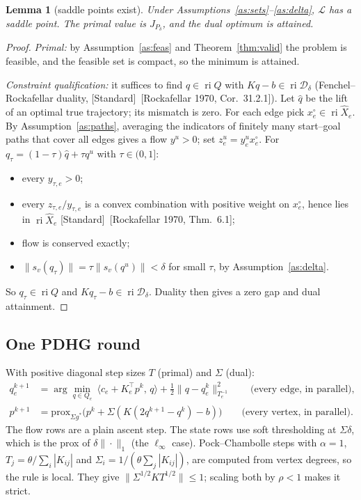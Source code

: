 \documentclass[11pt]{article}
\newcommand{\Jd}{J_{P_\delta}}
\newcommand{\ri}{\operatorname{ri}}
\newcommand{\std}{\textcolor{muted}{[Standard]}\ }
\theoremstyle{plain}
\newtheorem{lemma}[theorem]{Lemma}
\theoremstyle{definition}
\theoremstyle{remark}
\begin{document}
\begin{lemma}[saddle points exist]\label{lem:saddle}
Under Assumptions~\ref{as:sets}--\ref{as:delta}, $\mathcal L$ has a saddle point. The primal value is $\Jd$, and the dual optimum is attained.
\end{lemma}
\begin{proof}
\emph{Primal:} by Assumption~\ref{as:feas} and Theorem~\ref{thm:valid} the problem is feasible, and the feasible set is compact, so the minimum is attained.

\emph{Constraint qualification:} it suffices to find $q\in\ri Q$ with $Kq-b\in\ri\mathcal D_\delta$ (Fenchel--Rockafellar duality, \std[Rockafellar 1970, Cor.~31.2.1]). Let $\hat q$ be the lift of an optimal true trajectory; its mismatch is zero. For each edge pick $x^\circ_e\in\ri\hat X_e$. By Assumption~\ref{as:paths}, averaging the indicators of finitely many start--goal paths that cover all edges gives a flow $y^u>0$; set $z^u_e=y^u_ex^\circ_e$. For $q_\tau=(1-\tau)\hat q+\tau q^u$ with $\tau\in(0,1]$:
\begin{itemize}[leftmargin=1.2em]
  \item every $y_{\tau,e}>0$;
  \item every $z_{\tau,e}/y_{\tau,e}$ is a convex combination with positive weight on $x^\circ_e$, hence lies in $\ri\hat X_e$ \std[Rockafellar 1970, Thm.~6.1];
  \item flow is conserved exactly;
  \item $\|s_v(q_\tau)\|=\tau\|s_v(q^u)\|<\delta$ for small $\tau$, by Assumption~\ref{as:delta}.
\end{itemize}
So $q_\tau\in\ri Q$ and $Kq_\tau-b\in\ri\mathcal D_\delta$. Duality then gives a zero gap and dual attainment.
\end{proof}

\subsection{One PDHG round}
With positive diagonal step sizes $T$ (primal) and $\Sigma$ (dual):
\begin{align*}
q^{k+1}_e&=\arg\min_{q\in Q_e}\ \langle c_e+K_e^\top p^k,\,q\rangle+\tfrac12\|q-q^k_e\|^2_{T_e^{-1}}\qquad\text{(every edge, in parallel)},\\
p^{k+1}&=\mathrm{prox}_{\Sigma g^*}\big(p^k+\Sigma(K(2q^{k+1}-q^k)-b)\big)\qquad\text{(every vertex, in parallel)}.
\end{align*}
The flow rows are a plain ascent step. The state rows use soft thresholding at $\Sigma\delta$, which is the prox of $\delta\|\cdot\|_1$ (the $\ell_\infty$ case). Pock--Chambolle steps with $\alpha=1$, $T_j=\theta/\sum_i|K_{ij}|$ and $\Sigma_i=1/(\theta\sum_j|K_{ij}|)$, are computed from vertex degrees, so the rule is local. They give $\|\Sigma^{1/2}KT^{1/2}\|\le1$; scaling both by $\rho<1$ makes it strict.
\end{document}
